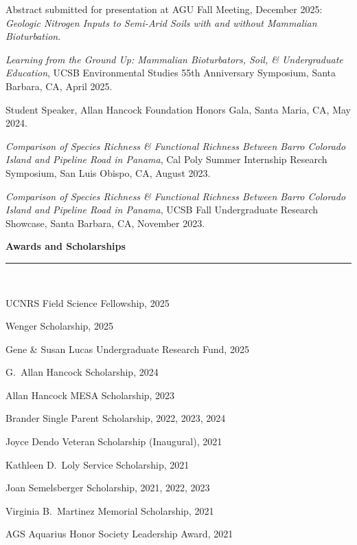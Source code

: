 \documentclass[letterpaper]{article}
\newcommand{\sectionheader}[1]{%
  \noindent\textbf{\Large #1}\\[-1.5ex]
  \noindent\rule{\linewidth}{0.4pt}\\[-1.5ex]
}
\newenvironment{biblist}{%
   \begin{list}{}{%
     \setlength{\labelwidth}{0pt}%
     \setlength{\labelsep}{1em}%
     \setlength{\leftmargin}{2em}%
     \setlength{\itemindent}{-1em}%
   }
}{\end{list}}
\begin{document}
\begin{biblist}

\item Abstract submitted for presentation at AGU Fall Meeting, December 2025: \textit{Geologic Nitrogen Inputs to Semi-Arid Soils with and without Mammalian Bioturbation}.

\item \textit{Learning from the Ground Up: Mammalian Bioturbators, Soil, \& Undergraduate Education}, UCSB Environmental Studies 55th Anniversary Symposium, Santa Barbara, CA, April 2025.

\item Student Speaker, Allan Hancock Foundation Honors Gala, Santa Maria, CA, May 2024.

\item \textit{Comparison of Species Richness \& Functional Richness Between Barro Colorado Island and Pipeline Road in Panama}, Cal Poly Summer Internship Research Symposium, San Luis Obispo, CA, August 2023.

\item \textit{Comparison of Species Richness \& Functional Richness Between Barro Colorado Island and Pipeline Road in Panama}, UCSB Fall Undergraduate Research Showcase, Santa Barbara, CA, November 2023.

\end{biblist}


\sectionheader{Awards and Scholarships}

\begin{biblist}
\item UCNRS Field Science Fellowship, 2025
\item Wenger Scholarship, 2025
\item Gene \& Susan Lucas Undergraduate Research Fund, 2025
\item G.\ Allan Hancock Scholarship, 2024
\item Allan Hancock MESA Scholarship, 2023
\item Brander Single Parent Scholarship, 2022, 2023, 2024
\item Joyce Dendo Veteran Scholarship (Inaugural), 2021
\item Kathleen D.\ Loly Service Scholarship, 2021
\item Joan Semelsberger Scholarship, 2021, 2022, 2023
\item Virginia B.\ Martinez Memorial Scholarship, 2021
\item AGS Aquarius Honor Society Leadership Award, 2021
\end{biblist}
\end{document}
